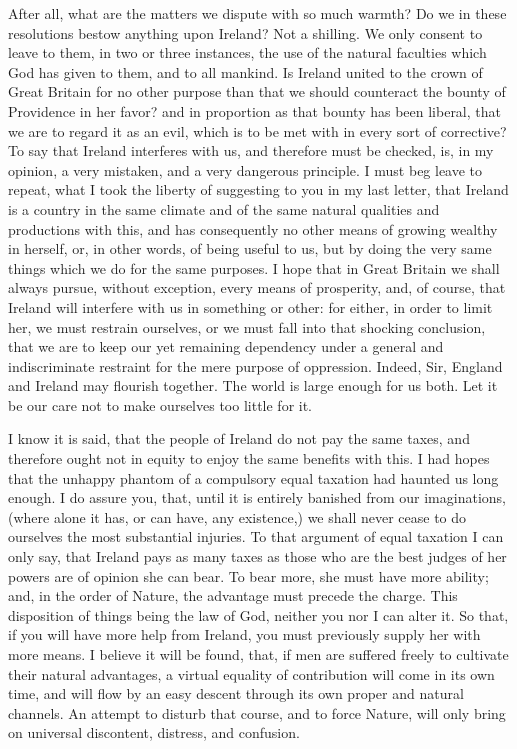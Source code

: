 After all, what are the matters we dispute with so much warmth? Do we in these resolutions bestow anything upon Ireland? Not a shilling. We only consent to leave to them, in two or three instances, the use of the natural faculties which God has given to them, and to all mankind. Is Ireland united to the crown of Great Britain for no other purpose than that we should counteract the bounty of Providence in her favor? and in proportion as that bounty has been liberal, that we are to regard it as an evil, which is to be met with in every sort of corrective? To say that Ireland interferes with us, and therefore must be checked, is, in my opinion, a very mistaken, and a very dangerous principle. I must beg leave to repeat, what I took the liberty of suggesting to you in my last letter, that Ireland is a country in the same climate and of the same natural qualities and productions with this, and has consequently no other means of growing wealthy in herself, or, in other words, of being useful to us, but by doing the very same things which we do for the same purposes. I hope that in Great Britain we shall always pursue, without exception, every means of prosperity, and, of course, that Ireland will interfere with us in something or other: for either, in order to limit her, we must restrain ourselves, or we must fall into that shocking conclusion, that we are to keep our yet remaining dependency under a general and indiscriminate restraint for the mere purpose of oppression. Indeed, Sir, England and Ireland may flourish together. The world is large enough for us both. Let it be our care not to make ourselves too little for it.

I know it is said, that the people of Ireland do not pay the same taxes, and therefore ought not in equity to enjoy the same benefits with this. I had hopes that the unhappy phantom of a compulsory equal taxation had haunted us long enough. I do assure you, that, until it is entirely banished from our imaginations, (where alone it has, or can have, any existence,) we shall never cease to do ourselves the most substantial injuries. To that argument of equal taxation I can only say, that Ireland pays as many taxes as those who are the best judges of her powers are of opinion she can bear. To bear more, she must have more ability; and, in the order of Nature, the advantage must precede the charge. This disposition of things being the law of God, neither you nor I can alter it. So that, if you will have more help from Ireland, you must previously supply her with more means. I believe it will be found, that, if men are suffered freely to cultivate their natural advantages, a virtual equality of contribution will come in its own time, and will flow by an easy descent through its own proper and natural channels. An attempt to disturb that course, and to force Nature, will only bring on universal discontent, distress, and confusion.

